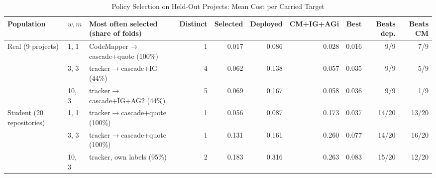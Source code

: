\begin{table}[t]
\caption{Policy Selection on Held-Out Projects: Mean Cost per Carried Target}\label{tab:policysel}
\centering\footnotesize
\setlength{\tabcolsep}{3pt}
\begin{tabular}{@{}llp{}rrrrrrr@{}}\toprule
Population & $w, m$ & Most often selected (share of folds) & Distinct & Selected & Deployed & CM+IG+AGi & Best & Beats dep. & Beats CM \\ \midrule
Real (9 projects) & 1, 1 & CodeMapper$\to$cascade+quote (100\%) & 1 & 0.017 & 0.086 & 0.028 & 0.016 & 9/9 & 7/9 \\
 & 3, 3 & tracker$\to$cascade+IG (44\%) & 4 & 0.062 & 0.138 & 0.057 & 0.035 & 9/9 & 5/9 \\
 & 10, 3 & tracker$\to$cascade+IG+AG2 (44\%) & 5 & 0.069 & 0.167 & 0.058 & 0.036 & 9/9 & 1/9 \\
Student (20 repositories) & 1, 1 & tracker$\to$cascade+quote (100\%) & 1 & 0.056 & 0.087 & 0.173 & 0.037 & 14/20 & 13/20 \\
 & 3, 3 & tracker$\to$cascade+quote (100\%) & 1 & 0.131 & 0.161 & 0.260 & 0.077 & 14/20 & 16/20 \\
 & 10, 3 & tracker, own labels (95\%) & 2 & 0.183 & 0.316 & 0.263 & 0.083 & 15/20 & 12/20 \\
\bottomrule
\end{tabular}
\end{table}
